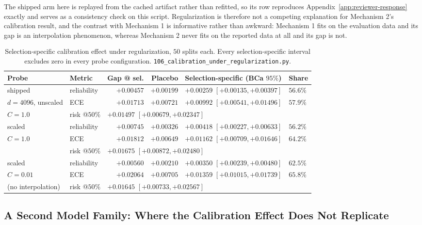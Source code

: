 \documentclass{article}
\begin{document}
The shipped arm here is replayed from the cached artifact rather than refitted,
so its row reproduces Appendix~\ref{app:reviewer-response} exactly and serves
as a consistency check on this script. Regularization is therefore not a
competing explanation for Mechanism 2's calibration result, and the contrast
with Mechanism 1 is informative rather than awkward: Mechanism 1 fits on the
evaluation data and its gap is an interpolation phenomenon, whereas Mechanism 2
never fits on the reported data at all and its gap is not.

\begin{table}[h]
\centering
\small
{\setlength{\tabcolsep}{4pt}
\begin{tabular}{@{}llrrll@{}}
\toprule
Probe & Metric & Gap @ sel. & Placebo & Selection-specific (BCa $95\%$) & Share \\
\midrule
shipped              & reliability & $+0.00457$ & $+0.00199$ & $+0.00259$ $[+0.00135,+0.00397]$ & $56.6\%$ \\
$d{=}4096$, unscaled & ECE         & $+0.01713$ & $+0.00721$ & $+0.00992$ $[+0.00541,+0.01496]$ & $57.9\%$ \\
$C{=}1.0$            & risk @$50\%$ & \multicolumn{4}{l}{$+0.01497$ $[+0.00679,+0.02347]$} \\
\midrule
scaled               & reliability & $+0.00745$ & $+0.00326$ & $+0.00418$ $[+0.00227,+0.00633]$ & $56.2\%$ \\
$C{=}1.0$            & ECE         & $+0.01812$ & $+0.00649$ & $+0.01162$ $[+0.00709,+0.01646]$ & $64.2\%$ \\
                     & risk @$50\%$ & \multicolumn{4}{l}{$+0.01675$ $[+0.00872,+0.02480]$} \\
\midrule
scaled               & reliability & $+0.00560$ & $+0.00210$ & $+0.00350$ $[+0.00239,+0.00480]$ & $62.5\%$ \\
$C{=}0.01$           & ECE         & $+0.02064$ & $+0.00705$ & $+0.01359$ $[+0.01015,+0.01739]$ & $65.8\%$ \\
(no interpolation)   & risk @$50\%$ & \multicolumn{4}{l}{$+0.01645$ $[+0.00733,+0.02567]$} \\
\bottomrule
\end{tabular}}
\caption{Selection-specific calibration effect under regularization, $50$
splits each. Every selection-specific interval excludes zero in every probe
configuration. \texttt{106\_calibration\_under\_regularization.py}.}
\label{tab:reg}
\end{table}

\subsection{A Second Model Family: Where the Calibration Effect Does Not Replicate}
\label{app:secondfamily}
\end{document}
